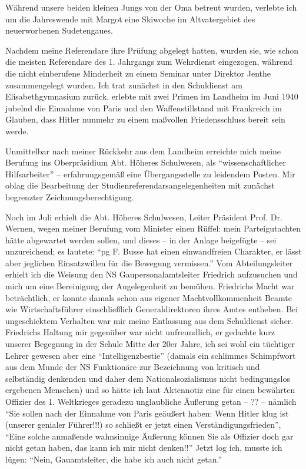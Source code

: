 \documentclass[a5paper,pagesize,10pt,twoside=true]{scrbook}
\renewcommand{\marginpar}[2][]{}
\begin{document}
Während unsere beiden kleinen Jungs von der Oma betreut wurden, verlebte ich um die Jahreswende mit Margot eine Skiwoche im Altvatergebiet des neuerworbenen Sudetengaues.

Nachdem meine Referendare ihre Prüfung abgelegt hatten, wurden sie, wie schon die meisten Referendare des 1. Jahrgangs zum Wehrdienst eingezogen, während die nicht einberufene Minderheit zu einem Seminar unter Direktor Jenthe zusammengelegt wurden. Ich trat zunächst in den Schuldienst am Elisabethgymnasium zurück, erlebte mit zwei Primen im Landheim im Juni 1940 jubelnd die Einnahme von Paris \marginpar{23} und den Waffenstillstand mit Frankreich im Glauben, dass Hitler nunmehr zu einem maßvollen Friedensschluss bereit sein werde.

Unmittelbar nach meiner Rückkehr aus dem Landheim erreichte mich meine Berufung ins Oberpräsidium Abt. Höheres Schulwesen, als \enquote{wissenschaftlicher Hilfsarbeiter} -- erfahrungsgemäß eine Übergangsstelle zu leidendem Posten. Mir oblag die Bearbeitung der Studienreferendarsangelegenheiten mit zunächst begrenzter Zeichnungsberechtigung.

Noch im Juli erhielt die Abt. Höheres Schulwesen, Leiter Präsident Prof. Dr. Wernen, wegen meiner Berufung vom Minister einen Rüffel: mein Parteigutachten hätte abgewartet werden sollen, und dieses -- in der Anlage beigefügte -- sei \marginpar{24} unzureichend; es lautete: \enquote{\ac{pg} F. Busse hat einen einwandfreien Charakter, er lässt aber jeglichen Einsatzwillen für die Bewegung vermissen.} Vom Abteilungsleiter erhielt ich die Weisung den NS Gaupersonalamtsleiter Friedrich aufzusuchen und mich um eine Bereinigung der Angelegenheit zu bemühen. Friedrichs Macht war beträchtlich, er konnte damals schon aus eigener Machtvollkommenheit \marginpar{25} Beamte wie Wirtschaftsführer einschließlich Generaldirektoren ihres Amtes entheben. Bei ungeschicktem Verhalten war mir meine Entlassung aus dem Schuldienst sicher. Friedrichs Haltung mir gegenüber war nicht unfreundlich, er gedachte kurz unserer Begegnung in der Schule Mitte der 20er Jahre, ich sei wohl ein tüchtiger Lehrer gewesen aber eine \enquote{Intelligenzbestie} (damals ein schlimmes Schimpfwort aus dem Munde der NS Funktionäre zur Bezeichnung von kritisch und selbständig denkenden und daher dem Nationalsozialismus nicht bedingungslos ergebenen Menschen) und so hätte ich laut Aktennotiz eine für einen bewährten Offizier des 1. Weltkrieges geradezu unglaubliche Äußerung getan -- ?? -- nämlich \enquote{Sie sollen nach der Einnahme von Paris \marginpar{26} geäußert haben: Wenn Hitler klug ist (unserer genialer Führer!!!) so schließt er jetzt einen Verständigungsfrieden}, \enquote{Eine solche anmaßende wahnsinnige Äußerung können Sie als Offizier doch gar nicht getan haben, das kann ich mir nicht denken!!} Jetzt log ich, musste ich lügen: \enquote{Nein, Gauamtsleiter, die habe ich auch nicht getan.}
\end{document}
